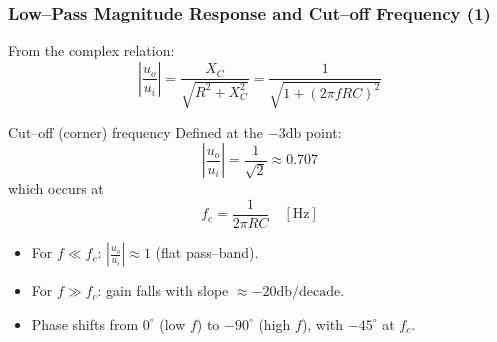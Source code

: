 \begin{frame}
	\frametitle{Low–Pass Magnitude Response and Cut–off Frequency (1)}
	From the complex relation:
	\begin{equation}
		\left|\frac{u_o}{u_i}\right|
		= \frac{X_C}{\sqrt{R^2 + X_C^2}}
		= \frac{1}{\sqrt{1 + (2\pi f R C)^2}}
	\end{equation}
	\begin{block}{Cut–off (corner) frequency}
		Defined at the \(-3\si{\decibel}\) point:
		\begin{equation}
			\left|\frac{u_o}{u_i}\right| = \frac{1}{\sqrt{2}} \approx 0.707
		\end{equation}
		which occurs at
		\begin{equation}
			f_c = \frac{1}{2\pi R C} \quad [\si{\hertz}]
		\end{equation}
	\end{block}
	\begin{itemize}
		\item For $f \ll f_c$: $\left|\frac{u_o}{u_i}\right|\approx 1$ (flat pass–band).
		\item For $f \gg f_c$: gain falls with slope \(\approx -20\si{\decibel}/\text{decade}\).
		\item Phase shifts from \(0^\circ\) (low $f$) to \(-90^\circ\) (high $f$), with \(-45^\circ\) at $f_c$.
	\end{itemize}
\end{frame}

